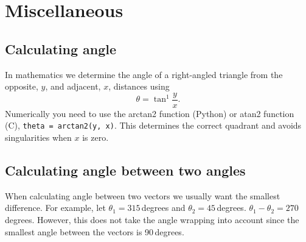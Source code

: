 \documentclass[a4paper, 12pt]{article}
\newcommand{\code}[1]{\texttt{#1}}
\begin{document}
\section{Miscellaneous}

\subsection{Calculating angle}

In mathematics we determine the angle of a right-angled triangle from
the opposite, $y$, and adjacent, $x$, distances using
%
\begin{equation}
  \theta = \tan^{1} \frac{y}{x}.
\end{equation}
%
Numerically you need to use the arctan2 function (Python) or atan2
function (C), \code{theta = arctan2(y, x)}.  This determines the
correct quadrant and avoids singularities when $x$ is zero.


\subsection{Calculating angle between two angles}


When calculating angle between two vectors we usually want the
smallest difference.  For example, let $\theta_1 = 315$\,degrees and
$\theta_2 = 45$\,degrees.  $\theta_1 - \theta_2 = 270$\,degrees.
However, this does not take the angle wrapping into account since the
smallest angle between the vectors is 90\,degrees.
\end{document}
